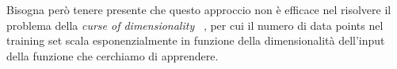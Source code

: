Bisogna però tenere presente che questo approccio non è efficace nel 
risolvere il problema della \textit{curse of dimensionality}
~\cite{bellman1957dynamic, Hughes1968OnTM, bronstein2021geometric}, 
per cui il numero di data points nel training set scala esponenzialmente 
in funzione della dimensionalità dell'input della funzione che 
cerchiamo di apprendere.
